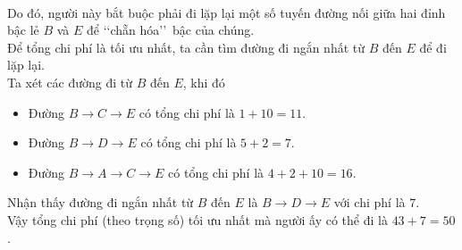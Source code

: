 \begin{ex}
{	\\
	Do đó, người này bắt buộc phải đi lặp lại một số tuyến đường nối giữa hai đỉnh bậc lẻ $B$ và $E$ để \lq\lq chẵn hóa\rq\rq\ bậc của chúng.
	\\
	Để tổng chi phí là tối ưu nhất, ta cần tìm đường đi ngắn nhất từ $B$ đến $E$ để đi lặp lại.
	\\
	Ta xét các đường đi từ $B$ đến $E$, khi đó
	\begin{itemize}
		\item Đường $B\to C\to E$ có tổng chi phí là $1+10=11$.
		\item Đường $B\to D\to E$ có tổng chi phí là $5+2=7$.
		\item Đường $B\to A\to C\to E$ có tổng chi phí là $4+2+10=16$.
	\end{itemize}
	Nhận thấy đường đi ngắn nhất từ $B$ đến $E$ là $B\to D\to E$ với chi phí là $7$.\\
	Vậy tổng chi phí (theo trọng số) tối ưu nhất mà người ấy có thể đi là $43+7=50$.
	}
\end{ex}

